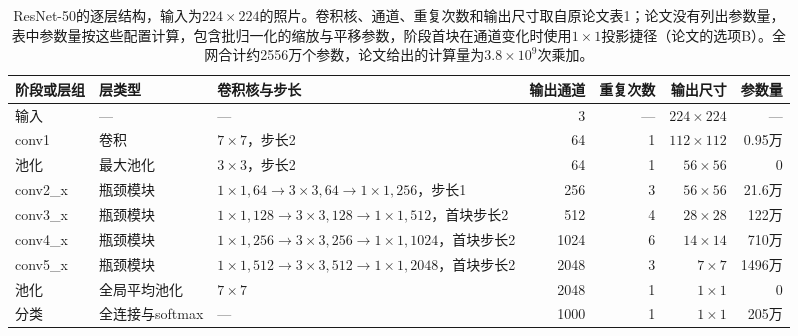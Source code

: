 \begin{table}[tbp]
  \centering
  \small
  \begin{tabularx}{\linewidth}{@{}llXrrrr@{}}
    \toprule
    阶段或层组 & 层类型 & 卷积核与步长 & 输出通道 & 重复次数 & 输出尺寸 & 参数量\\
    \midrule
    输入 & — & — & 3 & — & $224\times224$ & —\\
    conv1 & 卷积 & $7\times7$，步长2 & 64 & 1 & $112\times112$ & 0.95万\\
    池化 & 最大池化 & $3\times3$，步长2 & 64 & 1 & $56\times56$ & 0\\
    conv2\_x & 瓶颈模块 & $1\times1{,}64\to3\times3{,}64\to1\times1{,}256$，步长1 & 256 & 3 & $56\times56$ & 21.6万\\
    conv3\_x & 瓶颈模块 & $1\times1{,}128\to3\times3{,}128\to1\times1{,}512$，首块步长2 & 512 & 4 & $28\times28$ & 122万\\
    conv4\_x & 瓶颈模块 & $1\times1{,}256\to3\times3{,}256\to1\times1{,}1024$，首块步长2 & 1024 & 6 & $14\times14$ & 710万\\
    conv5\_x & 瓶颈模块 & $1\times1{,}512\to3\times3{,}512\to1\times1{,}2048$，首块步长2 & 2048 & 3 & $7\times7$ & 1496万\\
    池化 & 全局平均池化 & $7\times7$ & 2048 & 1 & $1\times1$ & 0\\
    分类 & 全连接与softmax & — & 1000 & 1 & $1\times1$ & 205万\\
    \bottomrule
  \end{tabularx}
  \caption{ResNet-50的逐层结构，输入为$224\times224$的照片。卷积核、通道、重复次数和输出尺寸取自原论文表1；论文没有列出参数量，表中参数量按这些配置计算，包含批归一化的缩放与平移参数，阶段首块在通道变化时使用$1\times1$投影捷径（论文的选项B）。全网合计约2556万个参数，论文给出的计算量为$3.8\times10^9$次乘加。}
  \label{tab:vision-ivm-resnet50-layers}
\end{table}

